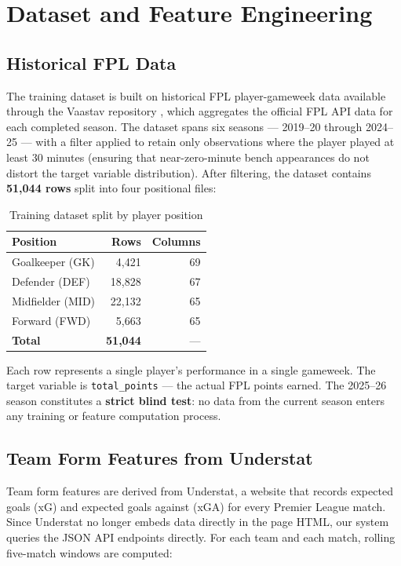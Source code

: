 \section{Dataset and Feature Engineering}

\subsection{Historical FPL Data}

The training dataset is built on historical FPL player-gameweek data available through the Vaastav repository \cite{vaastav2024fpl}, which aggregates the official FPL API data for each completed season. The dataset spans six seasons — 2019--20 through 2024--25 — with a filter applied to retain only observations where the player played at least 30 minutes (ensuring that near-zero-minute bench appearances do not distort the target variable distribution). After filtering, the dataset contains \textbf{51,044 rows} split into four positional files:

\begin{table}[h]
\centering
\caption{Training dataset split by player position}
\label{tab:dataset_split_en}
\begin{tabular}{lrr}
\toprule
\textbf{Position} & \textbf{Rows} & \textbf{Columns} \\
\midrule
Goalkeeper (GK)   & 4,421  & 69 \\
Defender (DEF)    & 18,828 & 67 \\
Midfielder (MID)  & 22,132 & 65 \\
Forward (FWD)     & 5,663  & 65 \\
\midrule
\textbf{Total}    & \textbf{51,044} & — \\
\bottomrule
\end{tabular}
\end{table}

Each row represents a single player's performance in a single gameweek. The target variable is \texttt{total\_points} — the actual FPL points earned. The 2025--26 season constitutes a \textbf{strict blind test}: no data from the current season enters any training or feature computation process.

\subsection{Team Form Features from Understat}

Team form features are derived from Understat, a website that records expected goals (xG) and expected goals against (xGA) for every Premier League match. Since Understat no longer embeds data directly in the page HTML, our system queries the JSON API endpoints directly. For each team and each match, rolling five-match windows are computed:

